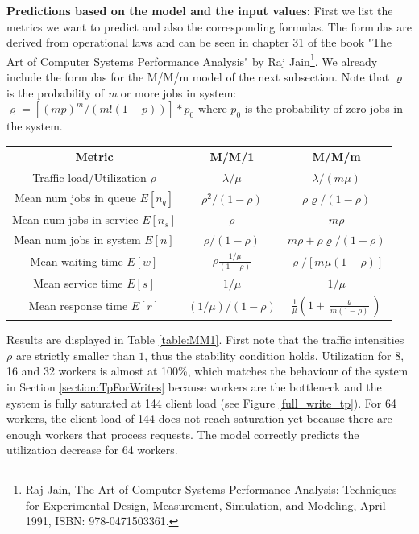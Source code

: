 \textbf{Predictions based on the model and the input values:} First we list the metrics we want to predict and also the corresponding formulas. The formulas are derived from operational laws and can be seen in chapter 31 of the book "The Art of Computer Systems Performance Analysis" by Raj Jain\footnote{Raj Jain, The Art of Computer Systems Performance Analysis: Techniques for Experimental Design, Measurement, Simulation, and Modeling, April 1991, ISBN: 978-0471503361.}. We already include the formulas for the M/M/m model of the next subsection. Note that $\varrho$ is the probability of \textit{m} or more jobs in system: \\ $\varrho=[(mp)^m/(m!(1-p))]*p_0$ where $p_0$ is the probability of zero jobs in the system.
\begin{table}[H]
		\centering
	\begin{tabular}{|c|c|c|}
		\hline
		\multicolumn{1}{|c|}{Metric} & \multicolumn{1}{c|}{M/M/1} & \multicolumn{1}{c|}{M/M/m}\\ \hline
		Traffic load/Utilization $\rho$ & $\lambda/\mu$ & $\lambda/(m\mu)$ \\ \hline
		Mean num jobs in queue $E[n_q]$     & $ \rho^{2}/(1 - \rho)$& $\rho \varrho / (1 - \rho)$ \\ \hline
		Mean num jobs in service $E[n_s]$   & $\rho$ & $m \rho$\\ \hline
		Mean num jobs in system $E[n]$      & $\rho / (1-\rho)$ & $m\rho + \rho \varrho / (1 - \rho)$ \\ \hline
		Mean waiting time $E[w]$            & $\rho \frac{1/\mu}{(1 - \rho)}$ & $\varrho/ [m\mu(1 - \rho)]$\\ \hline
		Mean service time $E[s]$            & $1/\mu$ & $1/\mu$ \\ \hline
		Mean response time $E[r]$           & $ (1/\mu)/(1 - \rho)$ & $\frac{1}{\mu} (1 + \frac{\varrho}{m(1 - \rho)})$ \\ \hline
	\end{tabular}
	\label{}
\end{table}

Results are displayed in Table \ref{table:MM1}. 
First note that the traffic intensities $\rho$ are strictly smaller than $1$, thus the stability condition holds.
Utilization for 8, 16 and 32 workers is almost at 100\%, which matches the behaviour of the system in Section \ref{section:TpForWrites} because workers are the bottleneck and the system is fully saturated at 144 client load (see Figure \ref{full_write_tp}).
For 64 workers, the client load of 144 does not reach saturation yet because there are enough workers that process requests. The model correctly predicts the utilization decrease for 64 workers. 

